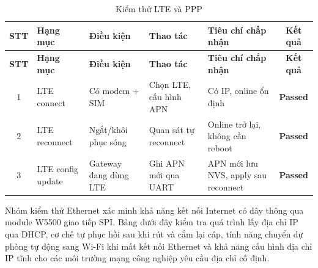         \begin{longtable}{|c|p{2cm}|p{3.5cm}|p{2.5cm}|p{4cm}|c|}
            \caption{Kiểm thử LTE và PPP}
            \label{tab:test_lte_ppp} \\
            \hline
            \textbf{STT} & \textbf{Hạng mục} & \textbf{Điều kiện} & \textbf{Thao tác} & \textbf{Tiêu chí chấp nhận} & \textbf{Kết quả} \\ \hline
            \endfirsthead

            \hline
            \textbf{STT} & \textbf{Hạng mục} & \textbf{Điều kiện} & \textbf{Thao tác} & \textbf{Tiêu chí chấp nhận} & \textbf{Kết quả} \\ \hline
            \endhead

            \hline
            \endfoot
            \endlastfoot

            1 & LTE connect & Có modem + SIM & Chọn LTE, cấu hình APN & Có IP, online ổn định & \textcolor{modern_blue}{\textbf{Passed}} \\ \hline
            2 & LTE reconnect & Ngắt/khôi phục sóng & Quan sát tự reconnect & Online trở lại, không cần reboot & \textcolor{modern_blue}{\textbf{Passed}} \\ \hline
            3 & LTE config update & Gateway đang dùng LTE & Ghi APN mới qua UART & APN mới lưu NVS, apply sau reconnect & \textcolor{modern_blue}{\textbf{Passed}} \\ \hline
        \end{longtable}

        Nhóm kiểm thử Ethernet xác minh khả năng kết nối Internet có dây thông qua module W5500 giao tiếp SPI. Bảng dưới đây kiểm tra quá trình lấy địa chỉ IP qua DHCP, cơ chế tự phục hồi sau khi rút và cắm lại cáp, tính năng chuyển dự phòng tự động sang Wi-Fi khi mất kết nối Ethernet và khả năng cấu hình địa chỉ IP tĩnh cho các môi trường mạng công nghiệp yêu cầu địa chỉ cố định.

